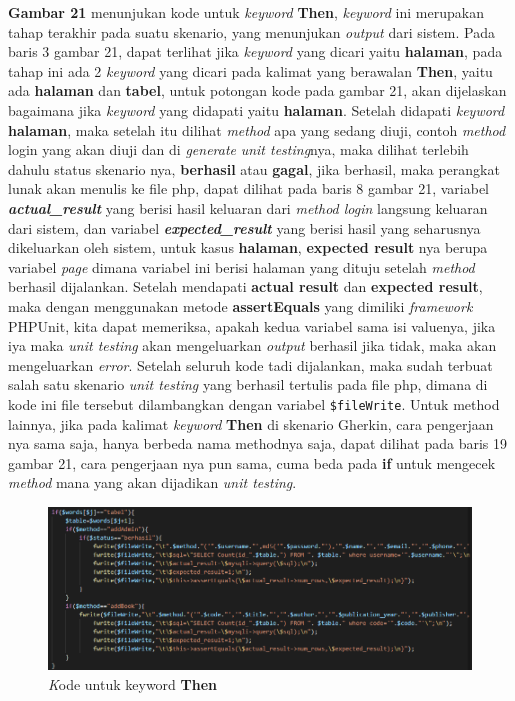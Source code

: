 \documentclass[a4paper,twoside]{article}
\begin{document}
\begin{enumerate}
\textbf{Gambar 21} menunjukan kode untuk \textit{keyword} \textbf{Then}, \textit{keyword} ini merupakan tahap terakhir pada suatu skenario, yang menunjukan \textit{output} dari sistem. Pada baris 3 gambar 21, dapat terlihat jika \textit{keyword} yang dicari yaitu \textbf{halaman}, pada tahap ini ada 2 \textit{keyword} yang dicari pada kalimat yang berawalan \textbf{Then}, yaitu ada \textbf{halaman} dan \textbf{tabel}, untuk potongan kode pada gambar 21, akan dijelaskan bagaimana jika \textit{keyword} yang didapati yaitu \textbf{halaman}. Setelah didapati \textit{keyword} \textbf{halaman}, maka setelah itu dilihat \textit{method} apa yang sedang diuji, contoh \textit{method} login yang akan diuji dan di \textit{generate} \textit{unit testing}nya, maka dilihat terlebih dahulu status skenario nya, \textbf{berhasil} atau \textbf{gagal}, jika berhasil, maka perangkat lunak akan menulis ke file php, dapat dilihat pada baris 8 gambar 21, variabel \textbf{\textit{actual\_result}} yang berisi hasil keluaran dari \textit{method login} langsung keluaran dari sistem, dan variabel \textbf{\textit{expected\_result}} yang berisi hasil yang seharusnya dikeluarkan oleh sistem, untuk kasus \textbf{halaman}, \textbf{expected result} nya berupa variabel \textit{page} dimana variabel ini berisi halaman yang dituju setelah \textit{method} berhasil dijalankan. Setelah mendapati \textbf{actual result} dan \textbf{expected result}, maka dengan menggunakan metode \textbf{assertEquals} yang dimiliki \textit{framework} PHPUnit, kita dapat memeriksa, apakah kedua variabel sama isi valuenya, jika iya maka \textit{unit testing} akan mengeluarkan \textit{output} berhasil jika tidak, maka akan mengeluarkan \textit{error}. Setelah seluruh kode tadi dijalankan, maka sudah terbuat salah satu skenario \textit{unit testing} yang berhasil tertulis pada file php, dimana di kode ini file tersebut dilambangkan dengan variabel \texttt{\$fileWrite}. Untuk method lainnya, jika pada kalimat \textit{keyword} \textbf{Then} di skenario Gherkin, cara pengerjaan nya sama saja, hanya berbeda nama methodnya saja, dapat dilihat pada baris 19 gambar 21, cara pengerjaan nya pun sama, cuma beda pada \textbf{if} untuk mengecek \textit{method} mana yang akan dijadikan \textit{unit testing}.

\begin{figure}[h!]
			\includegraphics[scale=0.70]{../DokumenSkripsi/gambar/implementasi11}
			\centering
			\caption{\textit Kode untuk keyword \textbf{Then}}
		\end{figure}


\end{enumerate}
\end{document}
